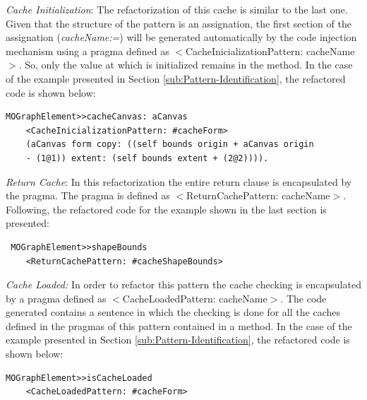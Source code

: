 \documentclass[preprint,10pt]{sigplanconf}
\begin{document}
\emph{Cache Initialization}: The refactorization of this cache is
similar to the last one. Given that the structure of the pattern is
an assignation, the first section of the assignation (\emph{cacheName:=})
will be generated automatically by the code injection mechanism using
a pragma defined as $<$CacheInicializationPattern: cacheName$>$.
So, only the value at which is initialized remains in the method.
In the case of the example presented in Section \ref{sub:Pattern-Identification},
the refactored code is shown below:

\begin{lstlisting} 
MOGraphElement>>cacheCanvas: aCanvas 
	<CacheInicializationPattern: #cacheForm>  
	(aCanvas form copy: ((self bounds origin + aCanvas origin
	- (1@1)) extent: (self bounds extent + (2@2)))). 
\end{lstlisting}

\emph{Return Cache}: In this refactorization the entire return clause
is encapsulated by the pragma. The pragma is defined as $<$ReturnCachePattern:
cacheName$>$. Following, the refactored code for the example shown in
the last section is presented:

\begin{lstlisting}
 MOGraphElement>>shapeBounds 
	<ReturnCachePattern: #cacheShapeBounds> 
\end{lstlisting}

\emph{Cache Loaded:} In order to refactor this pattern the cache checking
is encapsulated by a pragma defined as $<$CacheLoadedPattern:
cacheName$>$. The code generated contains a sentence in which the checking
is done for all the caches defined in the pragmas of this pattern
contained in a method. In the case of the example presented in Section
\ref{sub:Pattern-Identification}, the refactored code is shown below:
\begin{lstlisting} 
MOGraphElement>>isCacheLoaded 
	<CacheLoadedPattern: #cacheForm>
\end{lstlisting}
\end{document}
